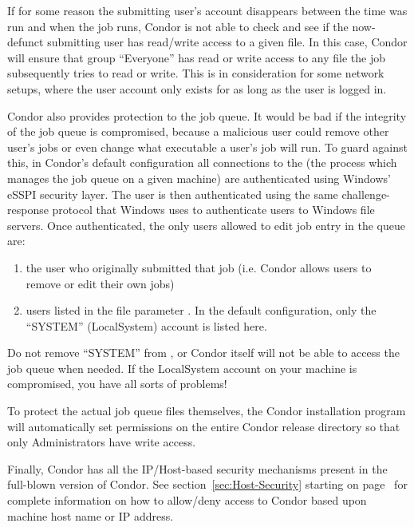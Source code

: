 If for some reason the submitting user's account disappears between the time
 was run and when the job runs, Condor is not able to check
and see if the now-defunct submitting user has read/write access to a given
file.  In this case, Condor will ensure that group ``Everyone'' has read or
write access to any file the job subsequently tries to read or write.  This
is in consideration for some network setups, where the user account only
exists for as long as the user is logged in.

Condor also provides protection to the job queue.  It would be bad if the
integrity of the job queue is compromised, because a malicious user could
remove other user's jobs or even change what executable a user's job will
run.  To guard against this, in Condor's default configuration all connections to the  (the
process which manages the job queue on a given machine) are authenticated
using Windows' eSSPI security layer.  The user is then authenticated
using the same challenge-response protocol that Windows uses to authenticate
users to Windows file servers.  Once authenticated, the only users
allowed to edit job entry in the queue are:
\begin{enumerate}
\item the user who originally submitted that job (i.e. Condor allows users
to remove or edit their own jobs)
\item users listed in the  file parameter
.  In the default configuration, only the
``SYSTEM'' (LocalSystem) account is listed here.  
\end{enumerate}
\Warn Do not remove ``SYSTEM'' from , or
Condor itself will not be able to access the job queue when needed.  If the
LocalSystem account on your machine is compromised, you have all sorts of
problems!

To protect the actual job queue files themselves, the Condor installation
program will automatically set permissions on the entire Condor release
directory so that only Administrators have write access.

Finally, Condor has all the IP/Host-based security mechanisms present
in the full-blown version of Condor.  See section~\ref{sec:Host-Security}
starting on page~\pageref{sec:Host-Security} for complete information
on how to allow/deny access to Condor based upon machine host name or
IP address.


